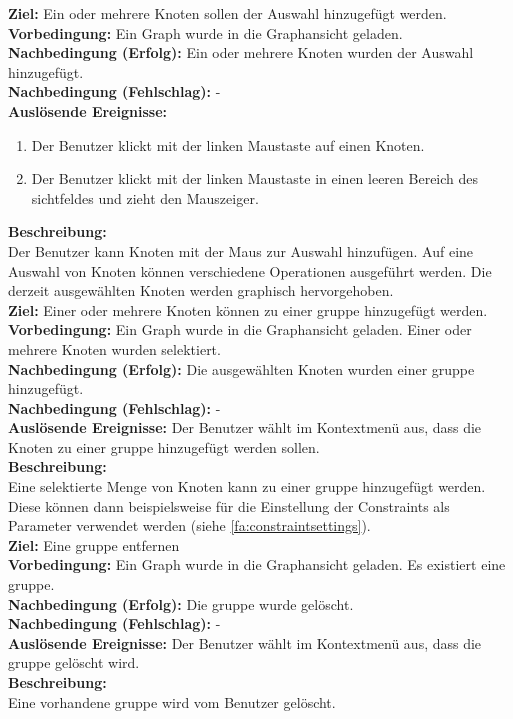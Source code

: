 \label{fa:selekt_knoten}
\textbf{Ziel:} Ein oder mehrere Knoten sollen der Auswahl hinzugefügt werden.\\
\textbf{Vorbedingung:} Ein Graph wurde in die Graphansicht geladen.\\
\textbf{Nachbedingung (Erfolg):} Ein oder mehrere Knoten wurden der Auswahl hinzugefügt.\\
\textbf{Nachbedingung (Fehlschlag):} -\\
\textbf{Auslösende Ereignisse:}
\begin{enumerate}[nolistsep, label=(\alph*)]
  \item Der Benutzer klickt mit der linken Maustaste auf einen Knoten.
  \item Der Benutzer klickt mit der linken Maustaste in einen leeren Bereich des \gls{sichtfeld}es und zieht den Mauszeiger.
\end{enumerate}
\textbf{Beschreibung:}\\
Der Benutzer kann Knoten mit der Maus zur Auswahl hinzufügen.
Auf eine Auswahl von Knoten können verschiedene Operationen ausgeführt werden. %
Die derzeit ausgewählten Knoten werden graphisch hervorgehoben.\\

\label{fa:gruppe}
\textbf{Ziel:} Einer oder mehrere Knoten können zu einer \gls{gruppe} hinzugefügt werden. \\
\textbf{Vorbedingung:} Ein Graph wurde in die Graphansicht geladen. Einer oder mehrere Knoten wurden selektiert. \\
\textbf{Nachbedingung (Erfolg):} Die ausgewählten Knoten wurden einer \gls{gruppe} hinzugefügt. \\
\textbf{Nachbedingung (Fehlschlag):} - \\
\textbf{Auslösende Ereignisse:} Der Benutzer wählt im Kontextmenü aus, dass die Knoten zu einer \gls{gruppe} hinzugefügt werden sollen. \\
\textbf{Beschreibung:}\\ Eine selektierte Menge von Knoten kann zu einer \gls{gruppe} hinzugefügt werden. Diese können dann beispielsweise für die Einstellung der Constraints als Parameter verwendet werden (siehe \ref{fa:constraintsettings}).\\

\label{fa:deletegruppe}
\textbf{Ziel:} Eine \gls{gruppe} entfernen \\
\textbf{Vorbedingung:} Ein Graph wurde in die Graphansicht geladen. Es existiert eine \gls{gruppe}.\\
\textbf{Nachbedingung (Erfolg):} Die \gls{gruppe} wurde gelöscht.\\
\textbf{Nachbedingung (Fehlschlag):} - \\
\textbf{Auslösende Ereignisse:} Der Benutzer wählt im Kontextmenü aus, dass die \gls{gruppe} gelöscht wird. \\
\textbf{Beschreibung:}\\
Eine vorhandene \gls{gruppe} wird vom Benutzer gelöscht.\\

